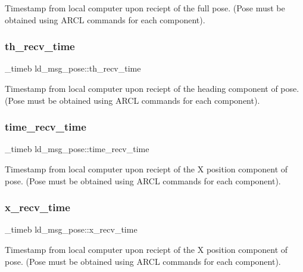 Timestamp from local computer upon reciept of the full pose. (Pose must be obtained using A\+R\+CL commands for each component). \mbox{\label{structld__msg__pose_acf025c0af4d2a3195c42d9ca133d3e74}} 
\subsubsection{\texorpdfstring{th\+\_\+recv\+\_\+time}{th\_recv\_time}}
{\footnotesize\ttfamily \+\_\+timeb ld\+\_\+msg\+\_\+pose\+::th\+\_\+recv\+\_\+time}

Timestamp from local computer upon reciept of the heading component of pose. (Pose must be obtained using A\+R\+CL commands for each component). \mbox{\label{structld__msg__pose_a68a03febea822176935f8e14f1897b54}} 
\subsubsection{\texorpdfstring{time\+\_\+recv\+\_\+time}{time\_recv\_time}}
{\footnotesize\ttfamily \+\_\+timeb ld\+\_\+msg\+\_\+pose\+::time\+\_\+recv\+\_\+time}

Timestamp from local computer upon reciept of the X position component of pose. (Pose must be obtained using A\+R\+CL commands for each component). \mbox{\label{structld__msg__pose_a4a4636747213a18e34dc05b5ea964dfd}} 
\subsubsection{\texorpdfstring{x\+\_\+recv\+\_\+time}{x\_recv\_time}}
{\footnotesize\ttfamily \+\_\+timeb ld\+\_\+msg\+\_\+pose\+::x\+\_\+recv\+\_\+time}

Timestamp from local computer upon reciept of the X position component of pose. (Pose must be obtained using A\+R\+CL commands for each component). \mbox{\label{structld__msg__pose_a1ab8f32a7a2edd172e33057719dbe9e9}} 
